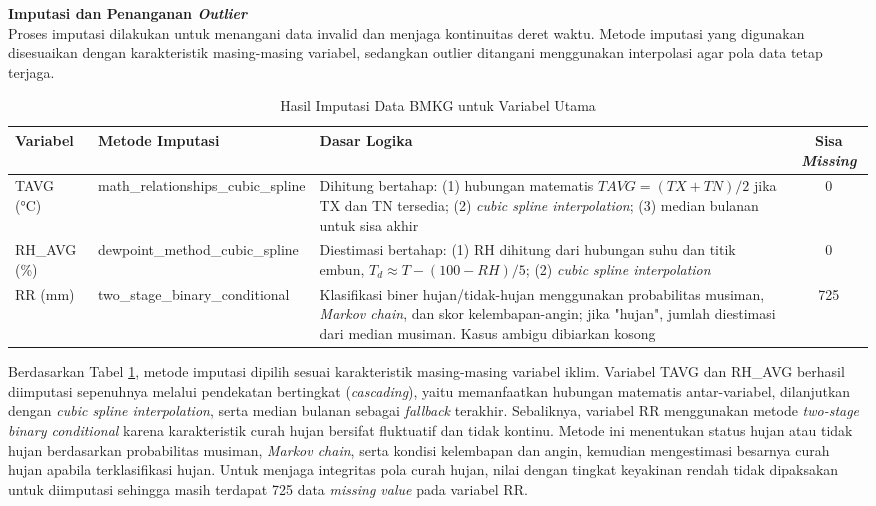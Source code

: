 \begin{enumerate}[(a)]
            \textbf{Imputasi dan Penanganan \textit{Outlier}} \\
            Proses imputasi dilakukan untuk menangani data invalid dan menjaga kontinuitas deret waktu. Metode imputasi yang digunakan disesuaikan dengan karakteristik masing-masing variabel, sedangkan outlier ditangani menggunakan interpolasi agar pola data tetap terjaga.
            \begin{table}[H]
                \centering
                \caption{Hasil Imputasi Data BMKG untuk Variabel Utama}
                \label{tab:bmkg_imputation}
                \scriptsize
                \setlength{\tabcolsep}{3pt} %
                \renewcommand{\arraystretch}{1.2} %
                \begin{tabularx}{\textwidth}{|l|p{4cm}|X|c|}
                \hline
                \textbf{Variabel} & \textbf{Metode Imputasi} & \textbf{Dasar Logika} & \textbf{Sisa \textit{Missing}} \\
                \hline
                TAVG (°C) &
                math\_relationships\_cubic\_spline &
                Dihitung bertahap: (1) hubungan matematis $TAVG=(TX+TN)/2$ jika TX dan TN tersedia; (2) \textit{cubic spline interpolation}; (3) median bulanan untuk sisa akhir &
                0 \\
                \hline
                RH\_AVG (\%) &
                dewpoint\_method\_cubic\_spline &
                Diestimasi bertahap: (1) RH dihitung dari hubungan suhu dan titik embun, $T_d \approx T - (100-RH)/5$; (2) \textit{cubic spline interpolation} &
                0 \\
                \hline
                RR (mm) &
                two\_stage\_binary\_conditional &
                Klasifikasi biner hujan/tidak-hujan menggunakan probabilitas musiman, \textit{Markov chain}, dan skor kelembapan-angin; jika "hujan", jumlah diestimasi dari median musiman. Kasus ambigu dibiarkan kosong &
                725 \\
                \hline
                \end{tabularx}
            \end{table}
            Berdasarkan Tabel \ref{tab:bmkg_imputation}, metode imputasi dipilih sesuai karakteristik masing-masing variabel iklim. Variabel TAVG dan RH\_AVG berhasil diimputasi sepenuhnya melalui pendekatan bertingkat (\textit{cascading}), yaitu memanfaatkan hubungan matematis antar-variabel, dilanjutkan dengan \textit{cubic spline interpolation}, serta median bulanan sebagai \textit{fallback} terakhir. Sebaliknya, variabel RR menggunakan metode \textit{two-stage binary conditional} karena karakteristik curah hujan bersifat fluktuatif dan tidak kontinu. Metode ini menentukan status hujan atau tidak hujan berdasarkan probabilitas musiman, \textit{Markov chain}, serta kondisi kelembapan dan angin, kemudian mengestimasi besarnya curah hujan apabila terklasifikasi hujan. Untuk menjaga integritas pola curah hujan, nilai dengan tingkat keyakinan rendah tidak dipaksakan untuk diimputasi sehingga masih terdapat 725 data \textit{missing value} pada variabel RR. \\

\end{enumerate}
